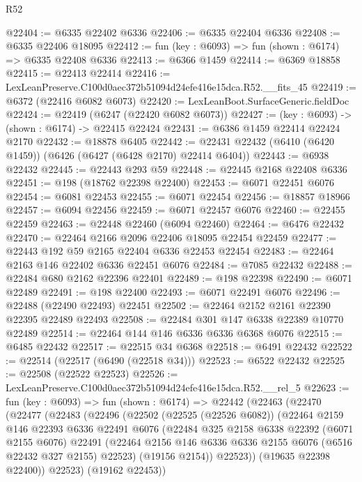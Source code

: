 \begin{lexlean}{R52}
\begin{coremodule}
@22404 := @6335 @22402 @6336
@22406 := @6335 @22404 @6336
@22408 := @6335 @22406 @18095
@22412 := fun (key : @6093) => fun (shown : @6174) => @6335 @22408 @6336
@22413 := @6366 @1459
@22414 := @6369 @18858
@22415 := @22413 @22414
@22416 := LexLeanPreserve.C100d0aec372b51094d24efe416e15dca.R52.__fits_45
@22419 := @6372 (@22416 @6082 @6073)
@22420 := LexLeanBoot.SurfaceGeneric.fieldDoc
@22424 := @22419 (@6247 (@22420 @6082 @6073))
@22427 := (key : @6093) -> (shown : @6174) -> @22415 @22424
@22431 := @6386 @1459 @22414 @22424 @2170
@22432 := @18878 @6405
@22442 := @22431 @22432 (@6410 (@6420 @1459)) (@6426 (@6427 (@6428 @2170) @22414 @6404))
@22443 := @6938 @22432
@22445 := @22443 @293 @59
@22448 := @22445 @2168 @22408 @6336
@22451 := @198 (@18762 @22398 @22400)
@22453 := @6071 @22451 @6076
@22454 := @6081 @22453
@22455 := @6071 @22454
@22456 := @18857 @18966
@22457 := @6094 @22456
@22459 := @6071 @22457 @6076
@22460 := @22455 @22459
@22463 := @22448 @22460 (@6094 @22460)
@22464 := @6476 @22432
@22470 := @22464 @2166 @2096 @22406 @18095 @22454 @22459
@22477 := @22443 @192 @59 @2165 @22404 @6336 @22453 @22454
@22483 := @22464 @2163 @146 @22402 @6336 @22451 @6076
@22484 := @7085 @22432
@22488 := @22484 @680 @2162 @22396 @22401
@22489 := @198 @22398
@22490 := @6071 @22489
@22491 := @198 @22400
@22493 := @6071 @22491 @6076
@22496 := @22488 (@22490 @22493) @22451
@22502 := @22464 @2152 @2161 @22390 @22395 @22489 @22493
@22508 := @22484 @301 @147 @6338 @22389 @10770 @22489
@22514 := @22464 @144 @146 @6336 @6336 @6368 @6076
@22515 := @6485 @22432
@22517 := @22515 @34 @6368
@22518 := @6491 @22432
@22522 := @22514 (@22517 (@6490 (@22518 @34)))
@22523 := @6522 @22432
@22525 := @22508 (@22522 @22523)
@22526 := LexLeanPreserve.C100d0aec372b51094d24efe416e15dca.R52.__rel_5
@22623 := fun (key : @6093) =>
  fun (shown : @6174) =>
  @22442
    (@22463
      (@22470
        (@22477
          (@22483
            (@22496
              (@22502
                (@22525 (@22526 @6082))
                (@22464
                  @2159
                  @146
                  @22393
                  @6336
                  @22491
                  @6076
                  (@22484
                    @325
                    @2158
                    @6338
                    @22392
                    (@6071 @2155 @6076)
                    @22491
                    (@22464 @2156 @146 @6336 @6336 @2155 @6076 (@6516 @22432 @327 @2155) @22523)
                    (@19156 @2154))
                  @22523))
              (@19635 @22398 @22400))
            @22523)
          (@19162 @22453))

\end{coremodule}
\end{lexlean}

